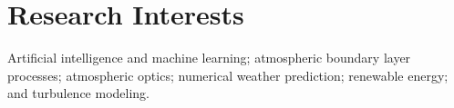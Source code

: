 \section{Research Interests}

Artificial intelligence and machine learning; atmospheric boundary layer processes; atmospheric optics; numerical weather prediction; renewable energy; and turbulence modeling. 






